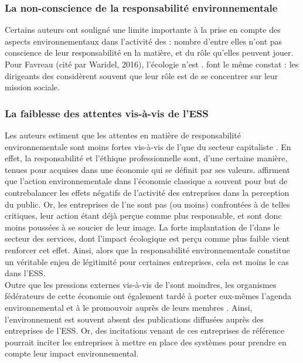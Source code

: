         \subsubsection{La non-conscience de la responsabilité environnementale}

            Certains auteurs ont souligné une limite importante à la prise en compte des aspects environnementaux dans l’activité des \oess : nombre d’entre elles n’ont pas conscience de leur responsabilité en la matière, et du rôle qu’elles peuvent jouer. Pour Favreau (cité par Waridel, 2016), l’écologie n’est . \textcite{dart2010green} font le même constat : les dirigeants des \oess considèrent souvent que leur rôle est de se concentrer sur leur mission sociale.

        \subsubsection{La faiblesse des attentes vis-à-vis de l’ESS}

            Les auteurs estiment que les attentes en matière de responsabilité environnementale sont moins fortes vis-à-vis de l’\ess que du secteur capitaliste \parencite{dart2010green,edwards2013environmental}. En effet, la responsabilité et l’éthique professionnelle sont, d’une certaine manière, tenues pour acquises dans une économie qui se définit par ses valeurs. \textcite{dart2010green} affirment que l’action environnementale dans l’économie classique a souvent pour but de contrebalancer les effets négatifs de l’activité des entreprises dans la perception du public. Or, les entreprises de l’\ess ne sont pas (ou moins) confrontées à de telles critiques, leur action étant déjà perçue comme plus responsable, et sont donc moins poussées à se soucier de leur image. La forte implantation de l’\ess dans le secteur des services, dont l’impact écologique est perçu comme plus faible vient renforcer cet effet. Ainsi, alors que la responsabilité environnementale constitue un véritable enjeu de légitimité pour certaines entreprises, cela est moins le cas dans l’ESS. \\

            Outre que les pressions externes vis-à-vis de l’\ess sont moindres, les organismes fédérateurs de cette économie ont également tardé à porter eux-mêmes l’agenda environnemental et à le promouvoir auprès de leurs membres \parencite{edwards2013environmental}. Ainsi, l’environnement est souvent absent des publications diffusées auprès des entreprises de l’ESS. Or, des incitations venant de ces entreprises de référence pourrait inciter les entreprises à mettre en place des systèmes pour prendre en compte leur impact environnemental.


